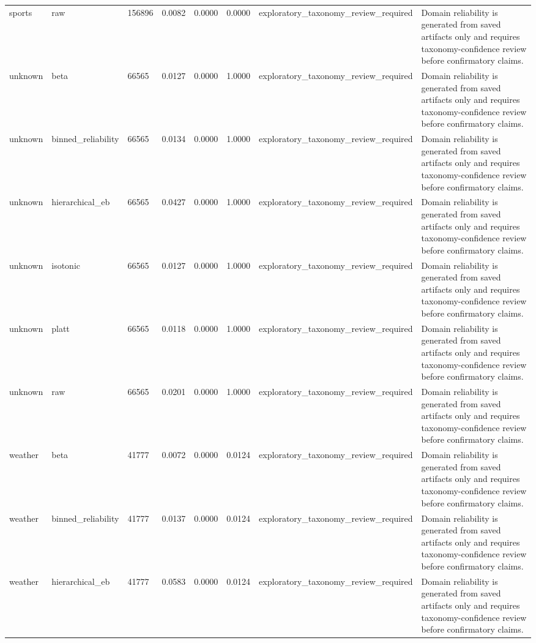 \begin{tabular}{llllllll}
sports & raw & 156896 & 0.0082 & 0.0000 & 0.0000 & exploratory\_taxonomy\_review\_required & Domain reliability is generated from saved artifacts only and requires taxonomy-confidence review before confirmatory claims. \\
unknown & beta & 66565 & 0.0127 & 0.0000 & 1.0000 & exploratory\_taxonomy\_review\_required & Domain reliability is generated from saved artifacts only and requires taxonomy-confidence review before confirmatory claims. \\
unknown & binned\_reliability & 66565 & 0.0134 & 0.0000 & 1.0000 & exploratory\_taxonomy\_review\_required & Domain reliability is generated from saved artifacts only and requires taxonomy-confidence review before confirmatory claims. \\
unknown & hierarchical\_eb & 66565 & 0.0427 & 0.0000 & 1.0000 & exploratory\_taxonomy\_review\_required & Domain reliability is generated from saved artifacts only and requires taxonomy-confidence review before confirmatory claims. \\
unknown & isotonic & 66565 & 0.0127 & 0.0000 & 1.0000 & exploratory\_taxonomy\_review\_required & Domain reliability is generated from saved artifacts only and requires taxonomy-confidence review before confirmatory claims. \\
unknown & platt & 66565 & 0.0118 & 0.0000 & 1.0000 & exploratory\_taxonomy\_review\_required & Domain reliability is generated from saved artifacts only and requires taxonomy-confidence review before confirmatory claims. \\
unknown & raw & 66565 & 0.0201 & 0.0000 & 1.0000 & exploratory\_taxonomy\_review\_required & Domain reliability is generated from saved artifacts only and requires taxonomy-confidence review before confirmatory claims. \\
weather & beta & 41777 & 0.0072 & 0.0000 & 0.0124 & exploratory\_taxonomy\_review\_required & Domain reliability is generated from saved artifacts only and requires taxonomy-confidence review before confirmatory claims. \\
weather & binned\_reliability & 41777 & 0.0137 & 0.0000 & 0.0124 & exploratory\_taxonomy\_review\_required & Domain reliability is generated from saved artifacts only and requires taxonomy-confidence review before confirmatory claims. \\
weather & hierarchical\_eb & 41777 & 0.0583 & 0.0000 & 0.0124 & exploratory\_taxonomy\_review\_required & Domain reliability is generated from saved artifacts only and requires taxonomy-confidence review before confirmatory claims. \\

\end{tabular}
